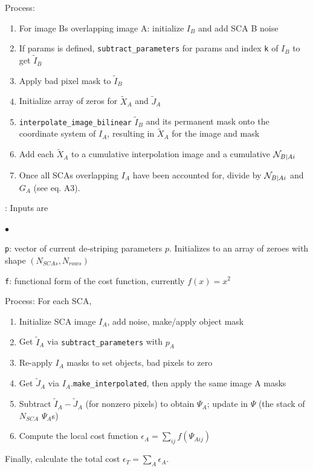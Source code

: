 \documentclass[12pt]{pasj01}
\begin{document}
Process:
\begin{enumerate}
\item For image Bs overlapping image A: initialize $I_B$ and add SCA B noise
\item If params is defined, {\tt subtract\_parameters} for params and index {\tt k} of $I_B$ to get $\tilde{I}_B$
\item Apply bad pixel mask to $\tilde{I}_B$
\item Initialize array of zeros for $\tilde{X}_A$ and $\tilde{J}_A$
\item {\tt interpolate\_image\_bilinear} $\tilde{I}_B$ and its permanent mask onto the coordinate system of $I_A$, resulting in $\tilde{X}_A$ for the image and mask
\item Add each $\tilde{X}_A$ to a cumulative interpolation image and a cumulative ${\cal N}_{B|Ai}$ 
\item Once all SCAs overlapping $I_A$ have been accounted for, divide by ${\cal N}_{B|Ai}$ and $G_A$ (see eq. A3).
\end{enumerate}

\vskip 0.05in

: Inputs are
\begin{list}{$\bullet$}{}
\item {\tt p}: vector of current de-striping parameters $p$. Initializes to an array of zeroes with shape $(N_{SCAs}, N_{rows})$
\item {\tt f}: functional form of the cost function, currently $f(x)=x^2$
\end{list}


Process: For each SCA,
\begin{enumerate}
    \item Initialize SCA image $I_A$, add noise, make/apply object mask
    \item Get $\tilde I_A$ via {\tt subtract\_parameters} with $p_A$ 
    \item Re-apply $I_A$ masks to set objects, bad pixels to zero
    \item Get $\tilde J_A$ via $I_A$.{\tt make\_interpolated}, then apply the same image A masks
    \item Subtract $ \tilde I_A - \tilde J_A$ (for nonzero pixels) to obtain $\Psi_A$; update in $\Psi$ (the stack of $N_{SCA}$ $\Psi_A$s)
    \item Compute the local cost function $\epsilon_A = \sum_{ij}f(\Psi_{Aij})$
\end{enumerate}
Finally, calculate the total cost $\epsilon_T=\sum_A\epsilon_A$.
\end{document}
